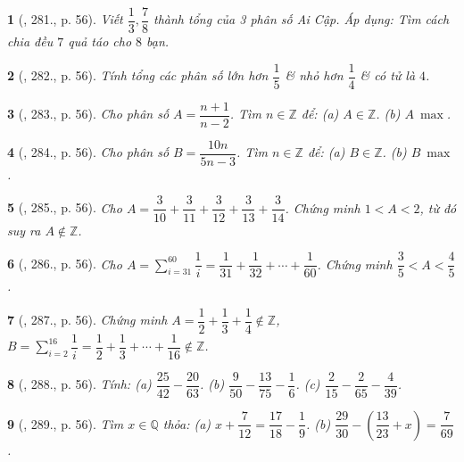 \documentclass{article}
\newtheorem{baitoan}{}
\begin{document}
\begin{baitoan}[\cite{Tuyen_Toan_6}, 281., p. 56]
	Viết $\dfrac{1}{3},\dfrac{7}{8}$ thành tổng của 3 phân số Ai Cập. Áp dụng: Tìm cách chia đều $7$ quả táo cho $8$ bạn.
\end{baitoan}

\begin{baitoan}[\cite{Tuyen_Toan_6}, 282., p. 56]
	Tính tổng các phân số lớn hơn $\dfrac{1}{5}$ \& nhỏ hơn $\dfrac{1}{4}$ \& có tử là $4$.
\end{baitoan}

\begin{baitoan}[\cite{Tuyen_Toan_6}, 283., p. 56]
	Cho phân số $A = \dfrac{n + 1}{n - 2}$. Tìm $n\in\mathbb{Z}$ để: (a) $A\in\mathbb{Z}$. (b) $A\ \max$.
\end{baitoan}

\begin{baitoan}[\cite{Tuyen_Toan_6}, 284., p. 56]
	Cho phân số $B = \dfrac{10n}{5n - 3}$. Tìm $n\in\mathbb{Z}$ để: (a) $B\in\mathbb{Z}$. (b) $B\ \max$.
\end{baitoan}

\begin{baitoan}[\cite{Tuyen_Toan_6}, 285., p. 56]
	Cho $A = \dfrac{3}{10} + \dfrac{3}{11} + \dfrac{3}{12} + \dfrac{3}{13} + \dfrac{3}{14}$. Chứng minh $1 < A < 2$, từ đó suy ra $A\notin\mathbb{Z}$.
\end{baitoan}

\begin{baitoan}[\cite{Tuyen_Toan_6}, 286., p. 56]
	Cho $A = \sum_{i=31}^{60} \dfrac{1}{i} = \dfrac{1}{31} + \dfrac{1}{32} + \cdots + \dfrac{1}{60}$. Chứng minh $\dfrac{3}{5} < A < \dfrac{4}{5}$.
\end{baitoan}

\begin{baitoan}[\cite{Tuyen_Toan_6}, 287., p. 56]
	Chứng minh $A = \dfrac{1}{2} + \dfrac{1}{3} + \dfrac{1}{4}\notin\mathbb{Z}$, $B = \sum_{i=2}^{16} \dfrac{1}{i} = \dfrac{1}{2} + \dfrac{1}{3} + \cdots + \dfrac{1}{16}\notin\mathbb{Z}$.
\end{baitoan}

\begin{baitoan}[\cite{Tuyen_Toan_6}, 288., p. 56]
	Tính: (a) $\dfrac{25}{42} - \dfrac{20}{63}$. (b) $\dfrac{9}{50} - \dfrac{13}{75} - \dfrac{1}{6}$. (c) $\dfrac{2}{15} - \dfrac{2}{65} - \dfrac{4}{39}$.
\end{baitoan}

\begin{baitoan}[\cite{Tuyen_Toan_6}, 289., p. 56]
	Tìm $x\in\mathbb{Q}$ thỏa: (a) $x + \dfrac{7}{12} = \dfrac{17}{18} - \dfrac{1}{9}$. (b) $\dfrac{29}{30} - \left(\dfrac{13}{23} + x\right) = \dfrac{7}{69}$.
\end{baitoan}
\end{document}
